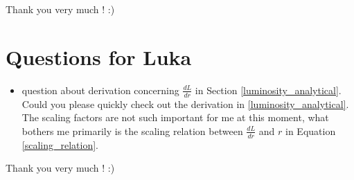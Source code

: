 \documentclass[../main/main.tex]{subfiles}
\begin{document}
Thank you very much ! :)

\newpage
\section{Questions for Luka}
\begin{itemize}
\item question about derivation concerning $\frac{dL}{dr}$ in Section \ref{luminosity_analytical}. Could you please quickly check out the derivation in \ref{luminosity_analytical}. The scaling factors are not such important for me at this moment, what bothers me primarily is the scaling relation between $\frac{dL}{dr}$ and $r$ in Equation \ref{scaling_relation}.
\end{itemize}

Thank you very much ! :)

\newpage
\end{document}
